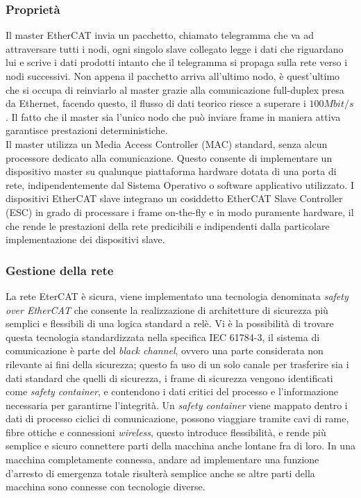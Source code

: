 \subsubsection{Proprietà}
Il master EtherCAT invia un pacchetto, chiamato telegramma che va ad attraversare tutti i nodi, ogni singolo slave collegato legge i dati che riguardano lui e scrive i dati prodotti intanto che il telegramma si propaga sulla rete verso i nodi successivi. Non appena il pacchetto arriva all'ultimo nodo, è quest'ultimo che si occupa di reinviarlo al master grazie alla comunicazione full-duplex presa da Ethernet, facendo questo, il flusso di dati teorico riesce a superare i $100 Mbit/s$. Il fatto che il master sia l'unico nodo che può inviare frame in maniera attiva garantisce prestazioni deterministiche.  \\Il master utilizza un Media Access Controller (MAC) standard, senza alcun processore dedicato alla comunicazione. Questo consente di implementare un dispositivo master su qualunque piattaforma hardware dotata di una porta di rete, indipendentemente dal Sistema Operativo o software applicativo utilizzato. I dispositivi EtherCAT slave integrano un cosiddetto EtherCAT Slave Controller (ESC) in grado di processare i frame on-the-fly e in modo puramente hardware, il che rende le prestazioni della rete predicibili e indipendenti dalla particolare implementazione dei dispositivi slave.
\subsubsection{Gestione della rete}
La rete EterCAT è sicura, viene implementato una tecnologia denominata \textit{safety over EtherCAT} che consente la realizzazione di architetture di sicurezza più semplici e flessibili di una logica standard a relè. Vi è la possibilità di trovare questa tecnologia standardizzata nella specifica IEC 61784-3, il sistema di comunicazione è parte del \textit{black channel}, ovvero una parte considerata non rilevante ai fini della sicurezza; questo fa uso di un solo canale per trasferire sia i dati standard che quelli di sicurezza, i frame di sicurezza vengono identificati come \textit{safety container}, e contendono i dati critici del processo e l'informazione necessaria per garantirne l'integrità. Un \textit{safety container} viene mappato dentro i dati di processo ciclici di comunicazione, possono viaggiare tramite cavi di rame, fibre ottiche e connessioni \textit{wireless}, questo introduce flessibilità, e rende più semplice e sicuro connettere parti della macchina anche lontane fra di loro. In una macchina completamente connessa, andare ad implementare una funzione d'arresto di emergenza totale risulterà semplice anche se altre parti della macchina sono connesse con tecnologie diverse. 
